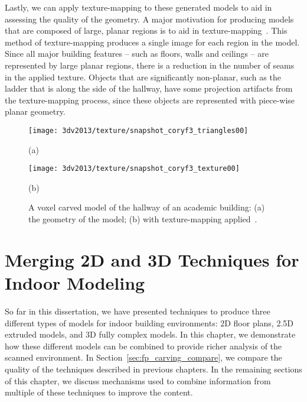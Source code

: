 \documentclass[12pt,onecolumn,oneside]{book}
\begin{document}
Lastly, we can apply texture-mapping to these generated models to aid in assessing the quality of the geometry.  A major motivation for producing models that are composed of large, planar regions is to aid in texture-mapping~\cite{Cheng13}.  This method of texture-mapping produces a single image for each region in the model.  Since all major building features -- such as floors, walls and ceilings -- are represented by large planar regions, there is a reduction in the number of seams in the applied texture.  Objects that are significantly non-planar, such as the ladder that is along the side of the hallway, have some projection artifacts from the texture-mapping process, since these objects are represented with piece-wise planar geometry.

\begin{figure}[t]

	\centering
	\begin{minipage}[b]{0.95\linewidth}
	\centerline{\texttt{[image: 3dv2013/texture/snapshot\_coryf3\_triangles00]}}
	\centerline{(a)}
	\end{minipage}
	\hfill
	\begin{minipage}[b]{0.95\linewidth}
	\centerline{\texttt{[image: 3dv2013/texture/snapshot\_coryf3\_texture00]}}
	\centerline{(b)}
	\end{minipage}

	\caption[Texture-mapping applied to voxel carving result.]{A voxel carved model of the hallway of an academic building: (a) the geometry of the model; (b) with texture-mapping applied~\cite{Cheng13}.}
	\label{fig:3dv2013_bhh_hallway}
\end{figure}


\chapter{Merging 2D and 3D Techniques for Indoor Modeling}
\label{ch:multimodal_modeling}

So far in this dissertation, we have presented techniques to produce three different types of models for indoor building environments:  2D floor plans, 2.5D extruded models, and 3D fully complex models.  In this chapter, we demonstrate how these different models can be combined to provide richer analysis of the scanned environment.  In Section~\ref{sec:fp_carving_compare}, we compare the quality of the techniques described in previous chapters.  In the remaining sections of this chapter, we discuss mechanisms used to combine information from multiple of these techniques to improve the content.  
\end{document}
